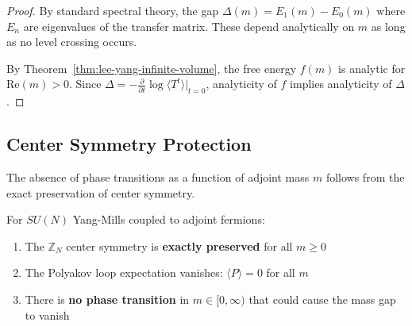 \begin{proof}
By standard spectral theory, the gap $\Delta(m) = E_1(m) - E_0(m)$ where $E_n$ 
are eigenvalues of the transfer matrix. These depend analytically on $m$ as 
long as no level crossing occurs.

By Theorem~\ref{thm:lee-yang-infinite-volume}, the free energy $f(m)$ is analytic 
for $\mathrm{Re}(m) > 0$. Since $\Delta = -\frac{\partial}{\partial t}\log\langle T^t \rangle|_{t=0}$, 
analyticity of $f$ implies analyticity of $\Delta$.
\end{proof}

\subsection{Center Symmetry Protection}
\label{subsec:center-protection}

The absence of phase transitions as a function of adjoint mass $m$ follows from 
the exact preservation of center symmetry.

\begin{theorem}
\label{thm:center-protection}
For $SU(N)$ Yang-Mills coupled to adjoint fermions:
\begin{enumerate}[label=(\roman*)]
\item The $\mathbb{Z}_N$ center symmetry is \textbf{exactly preserved} for all $m \geq 0$
\item The Polyakov loop expectation vanishes: $\langle P \rangle = 0$ for all $m$
\item There is \textbf{no phase transition} in $m \in [0, \infty)$ that could 
cause the mass gap to vanish
\end{enumerate}
\end{theorem}

